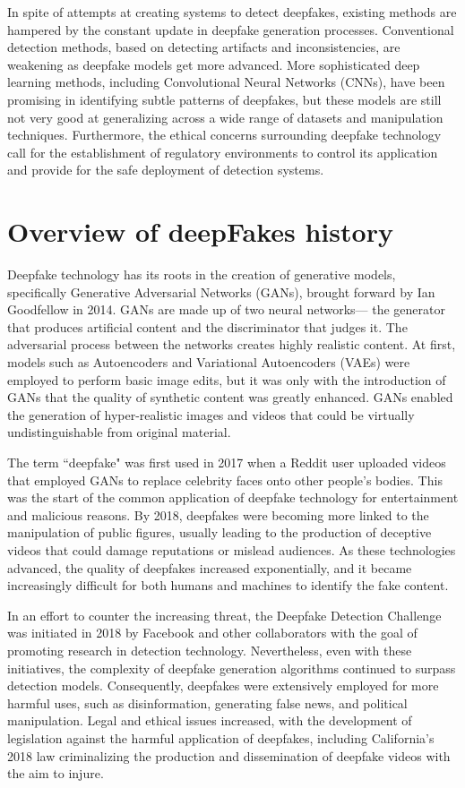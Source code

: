 \documentclass[lettersize,journal]{IEEEtran}
\begin{document}
In spite of attempts at creating systems to detect deepfakes, existing methods are hampered by the constant update in deepfake generation processes. Conventional detection methods, based on detecting artifacts and inconsistencies, are weakening as deepfake models get more advanced. More sophisticated deep learning methods, including Convolutional Neural Networks (CNNs), have been promising in identifying subtle patterns of deepfakes, but these models are still not very good at generalizing across a wide range of datasets and manipulation techniques. Furthermore, the ethical concerns surrounding deepfake technology call for the establishment of regulatory environments to control its application and provide for the safe deployment of detection systems.




\section{Overview of deepFakes history}
\noindent Deepfake technology has its roots in the creation of generative models, specifically Generative Adversarial Networks (GANs), brought forward by Ian Goodfellow in 2014. GANs are made up of two neural networks— the generator that produces artificial content and the discriminator that judges it. The adversarial process between the networks creates highly realistic content. At first, models such as Autoencoders and Variational Autoencoders (VAEs) were employed to perform basic image edits, but it was only with the introduction of GANs that the quality of synthetic content was greatly enhanced. GANs enabled the generation of hyper-realistic images and videos that could be virtually undistinguishable from original material.\cite{abbas2024unmasking}

The term ``deepfake" was first used in 2017 when a Reddit user uploaded videos that employed GANs to replace celebrity faces onto other people's bodies. This was the start of the common application of deepfake technology for entertainment and malicious reasons. By 2018, deepfakes were becoming more linked to the manipulation of public figures, usually leading to the production of deceptive videos that could damage reputations or mislead audiences. As these technologies advanced, the quality of deepfakes increased exponentially, and it became increasingly difficult for both humans and machines to identify the fake content.

In an effort to counter the increasing threat, the Deepfake Detection Challenge was initiated in 2018 by Facebook and other collaborators with the goal of promoting research in detection technology. Nevertheless, even with these initiatives, the complexity of deepfake generation algorithms continued to surpass detection models. Consequently, deepfakes were extensively employed for more harmful uses, such as disinformation, generating false news, and political manipulation. Legal and ethical issues increased, with the development of legislation against the harmful application of deepfakes, including California's 2018 law criminalizing the production and dissemination of deepfake videos with the aim to injure.
\end{document}
